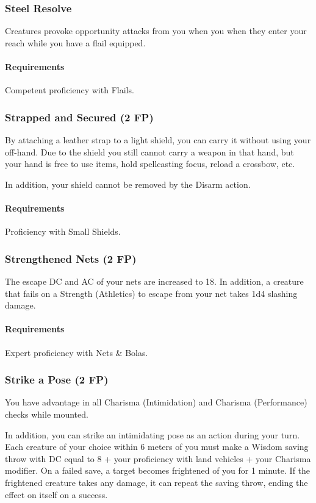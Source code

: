\subsubsection{Steel Resolve} \label{feat::steelresolve}
    Creatures provoke opportunity attacks from you when you when they enter your reach while you have a flail equipped.
    \paragraph{Requirements} Competent proficiency with Flails.
\subsubsection{Strapped and Secured (2 FP)} \label{feat::strappedandsecured}
    By attaching a leather strap to a light shield, you can carry it without using your off-hand.
    Due to the shield you still cannot carry a weapon in that hand, but your hand is free to use items, hold spellcasting focus, reload a crossbow, etc.

    In addition, your shield cannot be removed by the Disarm action.
    \paragraph{Requirements} Proficiency with Small Shields.
\subsubsection{Strengthened Nets (2 FP)} \label{feat::strengthenednets}
    The escape DC and AC of your nets are increased to 18.
    In addition, a creature that fails on a Strength (Athletics) to escape from your net takes 1d4 slashing damage.
    \paragraph{Requirements} Expert proficiency with Nets \& Bolas.
\subsubsection{Strike a Pose (2 FP)} \label{feat::strikeapose}
    You have advantage in all Charisma (Intimidation) and Charisma (Performance) checks while mounted.

    In addition, you can strike an intimidating pose as an action during your turn.
    Each creature of your choice within 6 meters of you must make a Wisdom saving throw with DC equal to 8 + your proficiency with land vehicles + your Charisma modifier.
    On a failed save, a target becomes frightened of you for 1 minute.
    If the frightened creature takes any damage, it can repeat the saving throw, ending the effect on itself on a success.

